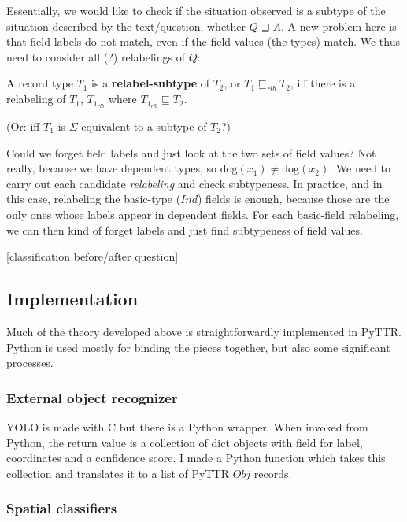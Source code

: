 \documentclass[11pt, a4paper]{article}
\begin{document}
Essentially, we would like to check if the situation observed is a subtype of the situation described by the text/question, whether $Q \sqsupseteq A$. A new problem here is that field labels do not match, even if the field values (the types) match. We thus need to consider all (?) relabelings of $Q$:

A record type $T_1$ is a \textbf{relabel-subtype} of $T_2$, or $T_1 \sqsubseteq_{rlb} T_2$,  iff there is a relabeling of $T_1$, $T_{1_{rlb}}$ where $T_{1_{rlb}} \sqsubseteq T_2$.

(Or: iff $T_1$ is $\Sigma$-equivalent to a subtype of $T_2$?)

Could we forget field labels and just look at the two sets of field values? Not really, because we have dependent types, so $\text{dog}(x_1) ≠ \text{dog}(x_2)$. We need to carry out each candidate \textit{relabeling} and check subtypeness. In practice, and in this case, relabeling the basic-type ($Ind$) fields is enough, because those are the only ones whose labels appear in dependent fields. For each basic-field relabeling, we can then kind of forget labels and just find subtypeness of field values.

[classification before/after question]



\subsection{Implementation}

Much of the theory developed above is straightforwardly implemented in PyTTR.
Python is used mostly for binding the pieces together, but also some significant processes.



\subsubsection{External object recognizer}

YOLO \citep{yolo} is made with C but there is a Python wrapper.
When invoked from Python, the return value is a collection of dict objects with field for label, coordinates and a confidence score.
I made a Python function which takes this collection and translates it to a list of PyTTR $Obj$ records.



\subsubsection{Spatial classifiers}
\end{document}
